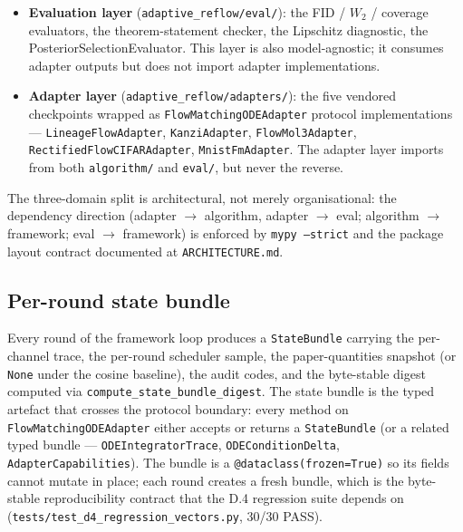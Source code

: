 \documentclass[journal,twocolumn,final]{IEEEtran}
\begin{document}
\begin{itemize}
\setlength{\itemsep}{2pt}
\item \textbf{Evaluation layer} (\texttt{adaptive\_reflow/eval/}): the FID / $W_2$ / coverage evaluators, the theorem-statement checker, the Lipschitz diagnostic, the PosteriorSelectionEvaluator. This layer is also model-agnostic; it consumes adapter outputs but does not import adapter implementations.
\end{itemize}

\begin{itemize}
\setlength{\itemsep}{2pt}
\item \textbf{Adapter layer} (\texttt{adaptive\_reflow/adapters/}): the five vendored checkpoints wrapped as \texttt{FlowMatchingODEAdapter} protocol implementations --- \texttt{LineageFlowAdapter}, \texttt{KanziAdapter}, \texttt{FlowMol3Adapter}, \texttt{RectifiedFlowCIFARAdapter}, \texttt{MnistFmAdapter}. The adapter layer imports from both \texttt{algorithm/} and \texttt{eval/}, but never the reverse.
\end{itemize}

The three-domain split is architectural, not merely organisational: the dependency direction (adapter \ensuremath{\to} algorithm, adapter \ensuremath{\to} eval; algorithm \ensuremath{\to} framework; eval \ensuremath{\to} framework) is enforced by \texttt{mypy --strict} and the package layout contract documented at \texttt{ARCHITECTURE.md}.

\subsection{Per-round state bundle}

Every round of the framework loop produces a \texttt{StateBundle} carrying the per-channel trace, the per-round scheduler sample, the paper-quantities snapshot (or \texttt{None} under the cosine baseline), the audit codes, and the byte-stable digest computed via \texttt{compute\_state\_bundle\_digest}. The state bundle is the typed artefact that crosses the protocol boundary: every method on \texttt{FlowMatchingODEAdapter} either accepts or returns a \texttt{StateBundle} (or a related typed bundle --- \texttt{ODEIntegratorTrace}, \texttt{ODEConditionDelta}, \texttt{AdapterCapabilities}). The bundle is a \texttt{@dataclass(frozen=True)} so its fields cannot mutate in place; each round creates a fresh bundle, which is the byte-stable reproducibility contract that the D.4 regression suite depends on (\texttt{tests/\allowbreak test\_d4\_\allowbreak regression\_\allowbreak vectors.py}, 30/30 PASS).
\end{document}

